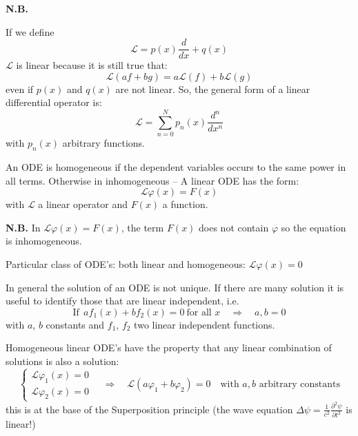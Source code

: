 \documentclass{article}
\begin{document}
\vspace{2mm}\noindent
\textbf{N.B.}

\noindent
If we define
\begin{equation}
    \mathcal{L} = p(x) \frac{d}{dx} + q(x)
\end{equation}
$\mathcal{L}$ is linear because it is still true that:
\begin{equation}
    \mathcal{L} (af + bg) = a \mathcal{L} (f) + b \mathcal{L} (g)
\end{equation}
even if $p(x)$ and $q(x)$ are not linear. \color{red}So, the general form of a linear differential operator is:
\color{black}
\begin{equation}
    \mathcal{L} = \sum_{n=0}^{N} p_n (x) \frac{d^n}{dx^n}
 \end{equation}
with $p_n(x)$ arbitrary functions.

\vspace{2mm}\noindent
An ODE is homogeneous if the dependent variables occurs to the same power in all terms. Otherwise in inhomogeneous -- A linear ODE has the form:
\begin{equation}
    \mathcal{L} \varphi(x) = F(x)
\end{equation}
with $\mathcal{L}$ a linear operator and $F(x)$ a function.

\vspace{2mm}\noindent
\textbf{N.B.} In $\mathcal{L} \varphi(x) = F(x)$, the term $F(x)$ does not contain $\varphi$ so the equation is inhomogeneous.

\noindent
Particular class of ODE's: both linear and homogeneous: $\mathcal{L} \varphi(x) = 0$

\noindent
In general the solution of an ODE is not unique. If there are many solution it is useful to identify those that are linear independent, i.e.
\begin{equation}
    \text{If} \ \ af_1 (x) + b f_2 (x) = 0 \ \text{for all }x \quad \Rightarrow \quad a, b = 0  
\end{equation}
with $a$, $b$ constants and $f_1$, $f_2$ two linear independent functions.

\newpage

\noindent
Homogeneous linear ODE's have the property that any linear combination of solutions is also a solution:
\begin{equation}
    \begin{cases}
        \mathcal{L} \varphi_1 (x) = 0 \\ \mathcal{L} \varphi_2 (x) = 0
    \end{cases} \quad \Rightarrow \quad \mathcal{L} (a \varphi_1 + b\varphi_2 ) = 0 \quad \text{with $a, b$ arbitrary constants}
\end{equation}
this is at the base of the \color{blue} Superposition principle \color{black} (the wave equation $\Delta \psi = \frac{1}{c^2} \frac{\partial^2 \psi}{\partial t^2}$ is linear!)
\end{document}
